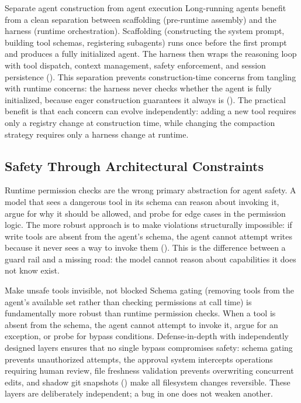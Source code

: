 \begin{lessonbox}{Separate agent construction from agent execution}
Long-running agents benefit from a clean separation between scaffolding (pre-runtime assembly) and the harness (runtime orchestration). Scaffolding (constructing the system prompt, building tool schemas, registering subagents) runs once before the first prompt and produces a fully initialized agent. The harness then wraps the reasoning loop with tool dispatch, context management, safety enforcement, and session persistence (). This separation prevents construction-time concerns from tangling with runtime concerns: the harness never checks whether the agent is fully initialized, because eager construction guarantees it always is (). The practical benefit is that each concern can evolve independently: adding a new tool requires only a registry change at construction time, while changing the compaction strategy requires only a harness change at runtime.
\end{lessonbox}

\subsection{Safety Through Architectural Constraints}

Runtime permission checks are the wrong primary abstraction for agent safety. A model that sees a dangerous tool in its schema can reason about invoking it, argue for why it should be allowed, and probe for edge cases in the permission logic. The more robust approach is to make violations structurally impossible: if write tools are absent from the agent's schema, the agent cannot attempt writes because it never sees a way to invoke them (). This is the difference between a guard rail and a missing road: the model cannot reason about capabilities it does not know exist.

\begin{lessonbox}{Make unsafe tools invisible, not blocked}
Schema gating (removing tools from the agent's available set rather than checking permissions at call time) is fundamentally more robust than runtime permission checks. When a tool is absent from the schema, the agent cannot attempt to invoke it, argue for an exception, or probe for bypass conditions. Defense-in-depth with independently designed layers ensures that no single bypass compromises safety: schema gating prevents unauthorized attempts, the approval system intercepts operations requiring human review, file freshness validation prevents overwriting concurrent edits, and shadow git snapshots () make all filesystem changes reversible. These layers are deliberately independent; a bug in one does not weaken another.
\end{lessonbox}

